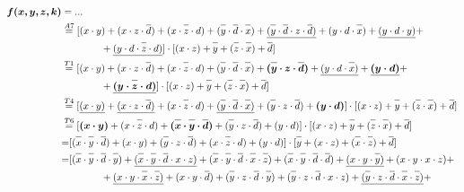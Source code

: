 \documentclass{article}
\newcommand*{\oline}[1]{\overline{#1\mathstrut}}
\newcommand{\bigspace}{\quad\quad\quad\quad}
\begin{document}
\begin{align*}
\bm{f(x,y,z,k)} &= ...\\
&\overset{A7}{=} [  (x \cdot y)+  (x \cdot z \cdot \oline{d}) + (x \cdot \oline{z} \cdot d) +  (\oline{y} \cdot \oline{d} \cdot \oline{x}) + \underline{(\oline{y} \cdot \oline{d} \cdot z \cdot \oline{d})} +  (y \cdot d \cdot \oline{x}) + \underline{(y \cdot d \cdot y)} + \\
&\bigspace +\underline{(y \cdot d \cdot \oline{z} \cdot d)} ] \cdot [(x  \cdot z) + \oline{y} +(\oline{z} \cdot \oline{x})  + \oline{d} ] \\
&\overset{T1}{=} [  (x \cdot y)+  (x \cdot z \cdot \oline{d}) + (x \cdot \oline{z} \cdot d) +  (\oline{y} \cdot \oline{d} \cdot \oline{x}) + \bm{(\oline{y} \cdot z \cdot \oline{d})} +   \underline{(y \cdot d \cdot \oline{x})} + \bm{\underline{(y \cdot d )}} + \\
&\bigspace +\bm{ \underline{(y \cdot \oline{z} \cdot d)}} ] \cdot [(x  \cdot z) + \oline{y} +(\oline{z} \cdot \oline{x})  + \oline{d} ] \\
&\overset{T4}{=}  [  \underline{(x \cdot y)}+  \underline{(x \cdot z \cdot \oline{d})} + (x \cdot \oline{z} \cdot d) +  \underline{(\oline{y} \cdot \oline{d} \cdot \oline{x})} + (\oline{y} \cdot z \cdot \oline{d}) +  \bm{(y \cdot d )}]\cdot [(x  \cdot z) + \oline{y} +(\oline{z} \cdot \oline{x})  + \oline{d} ] \\
&\overset{T6}{=}   [  \bm{(x \cdot y)}+ (x \cdot \oline{z} \cdot d) +  \bm{(\oline{x} \cdot \oline{y} \cdot \oline{d})} + (\oline{y} \cdot z \cdot \oline{d}) + (y \cdot d )]\cdot [(x  \cdot z) + \oline{y} +(\oline{z} \cdot \oline{x})  + \oline{d} ] \\
&{=}   [ (\oline{x} \cdot \oline{y} \cdot \oline{d})+ (x  \cdot y) +  (\oline{y} \cdot z \cdot \oline{d}) + (x \cdot \oline{z} \cdot d) + (y \cdot d )]\cdot [\oline{y} + (x  \cdot z)  +(\oline{x} \cdot \oline{z})  + \oline{d} ] \\
&{=} [(\oline{x} \cdot \oline{y} \cdot \oline{d} \cdot \oline{y} ) + \underline{(\oline{x} \cdot \oline{y} \cdot \oline{d} \cdot x \cdot z )} + (\oline{x} \cdot \oline{y} \cdot \oline{d} \cdot \oline{x}  \cdot \oline{z} ) + (\oline{x} \cdot \oline{y} \cdot \oline{d} \cdot \oline{d} ) + \underline{(x \cdot y \cdot \oline{y})} + (x \cdot y \cdot x \cdot z ) +  \\
&\bigspace + \underline{(x \cdot y \cdot \oline{x} \cdot \oline{z} )} + (x \cdot y \cdot \oline{d}) + (\oline{y} \cdot z \cdot \oline{d} \cdot \oline{y} ) + (\oline{y} \cdot z \cdot \oline{d} \cdot x \cdot z) + \underline{(\oline{y} \cdot z \cdot \oline{d} \cdot \oline{x} \cdot \oline{z} )} +\\

\end{align*}
\end{document}
